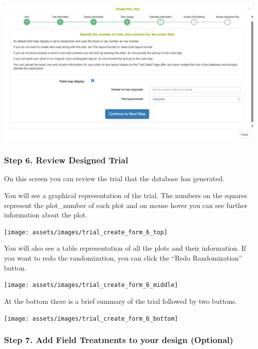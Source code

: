 \documentclass[
  12pt,
]{book}
\begin{document}
\begin{center}\includegraphics[width=0.95\linewidth]{assets/images/trial_create_form_5} \end{center}

\hypertarget{step-6.-review-designed-trial}{%
\subsubsection*{Step 6. Review Designed Trial}\label{step-6.-review-designed-trial}}


On this screen you can review the trial that the database has generated.

You will see a graphical representation of the trial. The numbers on the squares represent the plot\_number of each plot and on mouse hover you can see further information about the plot.

\begin{center}\texttt{[image: assets/images/trial\_create\_form\_6\_top]} \end{center}

You will also see a table representation of all the plots and their information. If you want to redo the randomization, you can click the ``Redo Randomization'' button.

\begin{center}\texttt{[image: assets/images/trial\_create\_form\_6\_middle]} \end{center}

At the bottom there is a brief summary of the trial followed by two buttons.

\begin{center}\texttt{[image: assets/images/trial\_create\_form\_6\_bottom]} \end{center}

\hypertarget{step-7.-add-field-treatments-to-your-design-optional}{%
\subsubsection*{Step 7. Add Field Treatments to your design (Optional)}\label{step-7.-add-field-treatments-to-your-design-optional}}
\end{document}
